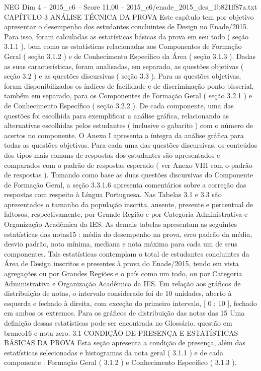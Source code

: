 \begin{textsample}{NEG Dim 4 – 2015\_c6 – Score 11.00 – 2015\_c6/enade\_2015\_des\_1b821ff87a.txt}  \label{ex:f4_neg_336}
CAPÍTULO 3 ANÁLISE TÉCNICA DA PROVA Este capítulo tem por objetivo apresentar o desempenho dos estudantes concluintes de Design no Enade/2015.
Para isso, foram calculadas as estatísticas básicas da prova em seu todo ( seção 3.1.1 ), bem como as estatísticas relacionadas aos Componentes de Formação Geral ( seção 3.1.2 ) e de Conhecimento Específico da Área ( seção 3.1.3 ).
Dadas as suas características, foram analisadas, em separado, as questões objetivas ( seção 3.2 ) e as questões discursivas ( seção 3.3 ).
Para as questões objetivas, foram disponibilizados os índices de facilidade e de discriminação ponto-bisserial, também em separado, para os Componentes de Formação Geral ( seção 3.2.1 ) e de Conhecimento Específico ( seção 3.2.2 ).
De cada componente, uma das questões foi escolhida para exemplificar a análise gráfica, relacionando as alternativas escolhidas pelos estudantes ( inclusive o gabarito ) com o número de acertos no componente.
O Anexo I apresenta a íntegra da análise gráfica para todas as questões objetivas.
Para cada uma das questões discursivas, os conteúdos dos tipos mais comuns de respostas dos estudantes são apresentados e comparados com o padrão de respostas esperado ( ver Anexo VIII com o padrão de respostas ).
Tomando como base as duas questões discursivas do Componente de Formação Geral, a seção 3.3.1.6 apresenta comentários sobre a correção das respostas com respeito à Língua Portuguesa.
Nas Tabelas 3.1 e 3.3 são apresentados o tamanho da população inscrita, ausente, presente e percentual de faltosos, respectivamente, por Grande Região e por Categoria Administrativa e Organização Acadêmica da IES.
As demais tabelas apresentam as seguintes estatísticas das notas15 : média do desempenho na prova, erro padrão da média, desvio padrão, nota mínima, mediana e nota máxima para cada um de seus componentes.
Tais estatísticas contemplam o total de estudantes concluintes da Área de Design inscritos e presentes à prova do Enade/2015, tendo em vista agregações ou por Grandes Regiões e o país como um todo, ou por Categoria Administrativa e Organização Acadêmica da IES.
Em relação aos gráficos de distribuição de notas, o intervalo considerado foi de 10 unidades, aberto à esquerda e fechado à direita, com exceção do primeiro intervalo, [ 0 ; 10 ], fechado em ambos os extremos.
Para os gráficos de distribuição das notas das 15 Uma definição dessas estatísticas pode ser encontrada no Glossário. questão em branco16 e nota zero. 3.1 CONDIÇÃO DE PRESENÇA E ESTATÍSTICAS BÁSICAS DA PROVA Esta seção apresenta a condição de presença, além das estatísticas selecionadas e histogramas da nota geral ( 3.1.1 ) e de cada componente : Formação Geral ( 3.1.2 ) e Conhecimento Específico ( 3.1.3 ).

\end{textsample}
